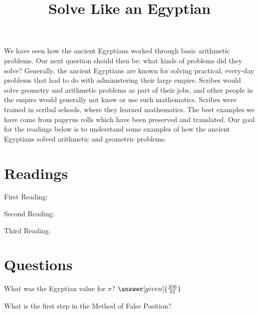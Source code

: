 \documentclass{ximera}
\title{Solve Like an Egyptian}
\begin{document}
\begin{abstract}
\end{abstract}
\maketitle



We have seen how the ancient Egyptians worked through basic arithmetic problems.  Our next question should then be: what kinds of problems did they solve?  Generally, the ancient Egyptians are known for solving practical, every-day problems that had to do with administering their large empire.  Scribes would solve geometry and arithmetic problems as part of their jobs, and other people in the empire would generally not know or use such mathematics.  Scribes were trained in scribal schools, where they learned mathematics.  The best examples we have come from papyrus rolls which have been preserved and translated.  Our goal for the readings below is to understand some examples of how the ancient Egyptians solved arithmetic and geometric problems.



\section{Readings}

First Reading: 

Second Reading: 


Third Reading: 


\section{Questions}

\begin{question}
What was the Egyptian value for $\pi$? $\answer[given]{\frac{256}{81}}$
\end{question}

\begin{question}
What is the first step in the Method of False Position?
\begin{multipleChoice}
\end{multipleChoice}
\end{question}


\end{document}
